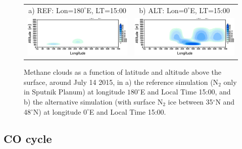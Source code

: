 \begin{figure}
  \begin{center}
\begin{tabular}[h]{cc}
\hspace{-0.cm}
a) REF:   Lon=$180^\circ$E, LT=15:00  & b) ALT:  Lon=$0^\circ$E, LT=15:00 \\
\hspace{-0.cm}
   \includegraphics[width=8.cm,angle=-0,clip]{figures/section_ch4cloud_lat_lon180E_LT15.eps} &
   \includegraphics[width=8.cm,angle=-0,clip]{figures/section_ch4cloud_lat_lon0E_LT15.eps} \\
\end{tabular}
    \caption{
\label{fg:section_clouds}
Methane clouds as a function of latitude and altitude
above the surface, around July 14 2015,
in 
a) the reference simulation (N$_2$ only in Sputnik Planum) 
at longitude  $180^\circ$E and Local Time 15:00, and 
b) the alternative simulation (with surface N$_2$ ice between 35$^\circ$N and
48$^\circ$N) at longitude  $0^\circ$E and Local Time 15:00.
}
  \end{center}
\end{figure}

\subsection{CO cycle}
\label{sc:co_results}

